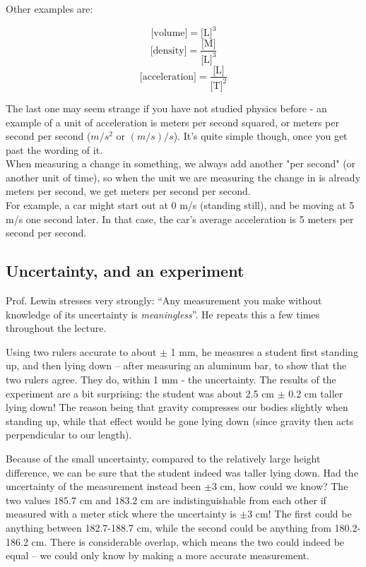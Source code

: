 Other examples are:

\begin{equation}
 \text{[volume]} =\text{[L]}^3
\end{equation}
\begin{equation}
 \text{[density]} = \frac{\text{[M]}}{\text{[L]}^3}
\end{equation}
\begin{equation}
 \text{[acceleration]} = \frac{\text{[L]}}{\text{[T]}^2}
\end{equation}

The last one may seem strange if you have not studied physics before - an example of a unit of acceleration is meters per second squared, or meters per second per second ($m/s^2$ or $(m/s)/s$). It's quite simple though, once you get past the wording of it.\\
When measuring a change in something, we always add another "per second" (or another unit of time), so when the unit we are measuring the change in is already meters per second, we get meters per second per second.\\
For example, a car might start out at 0 m/s (standing still), and be moving at 5 m/s one second later. In that case, the car's average acceleration is 5 meters per second per second.

\subsection{Uncertainty, and an experiment}
Prof. Lewin stresses very strongly: ``Any measurement you make without knowledge of its uncertainty is \emph{meaningless}''. He repeats this a few times throughout the lecture.

Using two rulers accurate to about $\pm$ 1 mm, he measures a student first standing up, and then lying down -- after measuring an aluminum bar, to show that the two rulers agree. They do, within 1 mm - the uncertainty.
The results of the experiment are a bit surprising: the student was about 2.5 cm $\pm$ 0.2 cm taller lying down! The reason being that gravity compresses our bodies slightly when standing up, while that effect would be gone lying down (since gravity then acts perpendicular to our length).

Because of the small uncertainty, compared to the relatively large height difference, we can be sure that the student indeed was taller lying down. Had the uncertainty of the measurement instead been $\pm 3$ cm, how could we know? The two values $185.7$ cm and $183.2$ cm are indistinguishable from each other if measured with a meter stick where the uncertainty is $\pm 3$ cm! The first could be anything between 182.7-188.7 cm, while the second could be anything from 180.2-186.2 cm. There is considerable overlap, which means the two could indeed be equal -- we could only know by making a more accurate measurement.


